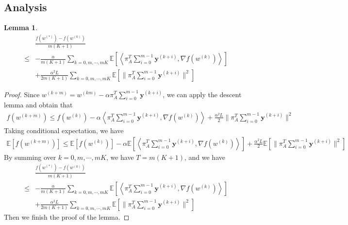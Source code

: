 \documentclass{article}
\newtheorem{lemma}[thm]{Lemma}
\newcommand{\vy}{{\mathbf{y}}}
\newcommand{\EE}[1]{\mathbb{E}\left[#1\right]}
\newcommand{\norm}[1]{\| #1 \|}
\newcommand{\ip}[1]{\left\langle#1\right\rangle}
\begin{document}
\subsection{Analysis}
\begin{lemma}
  \begin{align*}
    &\frac{f(w^{(*)})-f(w^{(0)})}{m(K+1)}
    \\\leq& -\frac{\alpha}{m(K+1)}\sum_{k=0,m,\cdots,mK} \EE{\ip{\pi_{A}^T\sum_{i=0}^{m-1}\vy^{(k+i)},\nabla f(w^{(k)})}}\\&+\frac{\alpha^2L}{2m(K+1)}\sum_{k=0,m,\cdots,mK}\EE{\norm{\pi_{A}^T\sum_{i=0}^{m-1}\vy^{(k+i)}}^2}
  \end{align*}
\end{lemma}
\begin{proof}
Since $w^{(k+m)}=w^{(km)}-\alpha\pi_{A}^T\sum_{i=0}^{m-1}\vy^{(k+i)}$, we can apply the descent lemma and obtain that
\begin{align*}
  f(w^{(k+m)})\leq f(w^{(k)})-\alpha \ip{\pi_{A}^T\sum_{i=0}^{m-1}\vy^{(k+i)},\nabla f(w^{(k)})}+\frac{\alpha^2L}{2}\norm{\pi_{A}^T\sum_{i=0}^{m-1}\vy^{(k+i)}}^2
\end{align*}
Taking conditional expectation, we have
\begin{align*}
  \EE{f(w^{(k+m)})}\leq \EE{f(w^{(k)})}-\alpha \EE{\ip{\pi_{A}^T\sum_{i=0}^{m-1}\vy^{(k+i)},\nabla f(w^{(k)})}}+\frac{\alpha^2L}{2}\EE{\norm{\pi_{A}^T\sum_{i=0}^{m-1}\vy^{(k+i)}}^2}
\end{align*}
By summing over $k=0,m,\cdots,mK$, we have $T=m(K+1)$, and we have
\begin{align*}
  &\frac{f(w^{(*)})-f(w^{(0)})}{m(K+1)}
  \\\leq& -\frac{\alpha}{m(K+1)}\sum_{k=0,m,\cdots,mK} \EE{\ip{\pi_{A}^T\sum_{i=0}^{m-1}\vy^{(k+i)},\nabla f(w^{(k)})}}\\&+\frac{\alpha^2L}{2m(K+1)}\sum_{k=0,m,\cdots,mK}\EE{\norm{\pi_{A}^T\sum_{i=0}^{m-1}\vy^{(k+i)}}^2}
\end{align*}
Then we finish the proof of the lemma.
\end{proof}
\end{document}

